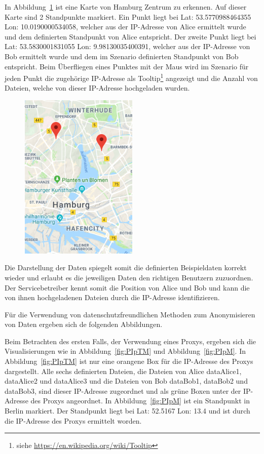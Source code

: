 \documentclass[
    fontsize=12pt,
    headings=small,
    parskip=half,           %
    bibliography=totoc,
    numbers=noenddot,       %
    open=any,               %
    ]{scrreprt}
\begin{document}
In Abbildung~\ref{fig:ungIpM} ist eine Karte von Hamburg Zentrum zu erkennen.
Auf dieser Karte sind 2 Standpunkte markiert.
Ein Punkt liegt bei Lat: 53.5770988464355 Lon: 10.0190000534058, welcher aus der IP-Adresse von Alice ermittelt wurde und dem definierten Standpunkt von Alice entspricht.
Der zweite Punkt liegt bei Lat: 53.5830001831055 Lon: 9.98130035400391, welcher aus der IP-Adresse von Bob ermittelt wurde und dem im Szenario definierten Standpunkt von Bob entspricht.
Beim Überfliegen eines Punktes mit der Maus wird im Szenario für jeden Punkt die zugehörige IP-Adresse als Tooltip\footnote{siehe \url{https://en.wikipedia.org/wiki/Tooltip}} angezeigt und die Anzahl von Dateien, welche von dieser IP-Adresse hochgeladen wurden.

\begin{figure}[H]
\includegraphics[width=0.5\textwidth , height=0.4\textheight]{../pic/IP-Proxy-SetA.PNG}
\label{fig:ungIpM}
\end{figure}

Die Darstellung der Daten spiegelt somit die definierten Beispieldaten korrekt wieder und erlaubt es die jeweiligen Daten den richtigen Benutzern zuzuordnen. 
Der Servicebetreiber kennt somit die Position von Alice und Bob und kann die von ihnen hochgeladenen Dateien durch die IP-Adresse identifizieren.

Für die Verwendung von datenschutzfreundlichen Methoden zum Anonymisieren von Daten ergeben sich de folgenden Abbildungen.

Beim Betrachten des ersten Falls, der Verwendung eines Proxys, ergeben sich die Visualisierungen wie in Abbildung~\ref{fig:PIpTM} und Abbildung~\ref{fig:PIpM}.
In Abbildung~\ref{fig:PIpTM} ist nur eine orangene Box für die IP-Adresse des Proxys dargestellt.
Alle sechs definierten Dateien, die Dateien von Alice dataAlice1, dataAlice2 und dataAlice3 und die Dateien von Bob dataBob1, dataBob2 und dataBob3, sind dieser IP-Adresse zugeordnet und als grüne Boxen unter der IP-Adresse des Proxys angeordnet.
In Abbildung~\ref{fig:PIpM} ist ein Standpunkt in Berlin markiert.
Der Standpunkt liegt bei Lat: 52.5167 Lon: 13.4 und ist durch die IP-Adresse des Proxys ermittelt worden. 
\end{document}
